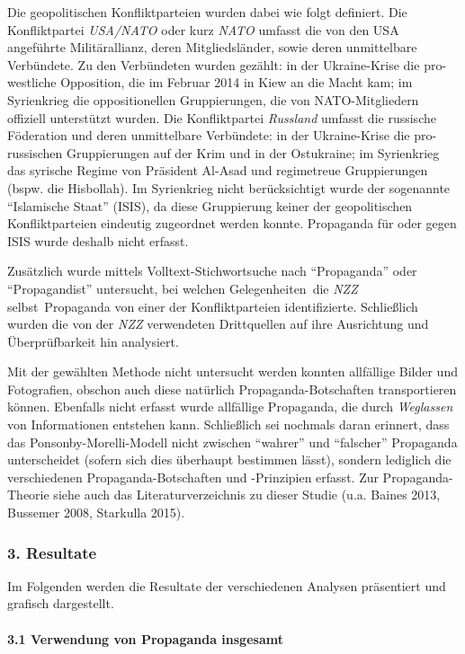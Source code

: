 Die geopolitischen Konflikt­parteien wurden dabei wie folgt definiert.
Die Konfliktpartei \emph{USA/NATO} oder kurz \emph{NATO} umfasst die von
den USA angeführte Militärallianz, deren Mitgliedsländer, sowie deren
unmittelbare Verbündete. Zu den Verbündeten wurden gezählt: in der
Ukraine-Krise die pro-westliche Opposition, die im Februar 2014 in Kiew
an die Macht kam; im Syrienkrieg die oppositionellen Gruppierungen, die
von NATO-Mitgliedern offiziell unterstützt wurden. Die Konfliktpartei
\emph{Russland} umfasst die russische Föderation und deren unmittelbare
Verbündete: in der Ukraine-Krise die pro-russischen Gruppierungen auf
der Krim und in der Ostukraine; im Syrienkrieg das syrische Regime von
Präsident Al-Asad und regimetreue Gruppierungen (bspw. die Hisbollah).
Im Syrienkrieg nicht berücksichtigt wurde der sogenannte ``Islamische
Staat'' (ISIS), da diese Gruppierung keiner der geopolitischen
Konfliktparteien eindeutig zugeordnet werden konnte. Propaganda für oder
gegen ISIS wurde deshalb nicht erfasst.

Zusätzlich wurde mittels Volltext-Stichwortsuche nach ``Propaganda''
oder ``Propagandist'' untersucht, bei welchen Gelegenheiten~die
\emph{NZZ} selbst~Propaganda von einer der Konflikt­parteien
identifizierte. Schließlich wurden die von der \emph{NZZ} verwendeten
Drittquellen auf ihre Ausrichtung und Überprüfbarkeit hin analysiert.

Mit der gewählten Methode nicht untersucht werden konnten allfällige
Bilder und Fotografien, obschon auch diese natürlich
Propaganda-Botschaften transportieren können. Ebenfalls nicht erfasst
wurde allfällige Propaganda, die durch \emph{Weglassen} von
Informationen entstehen kann. Schließlich sei nochmals daran erinnert,
dass das Ponsonby-Morelli-Modell nicht zwischen ``wahrer'' und
``falscher'' Propaganda unterscheidet (sofern sich dies überhaupt
bestimmen lässt), sondern lediglich die verschiedenen
Propaganda-Botschaften und -Prinzipien erfasst. Zur Propaganda-Theorie
siehe auch das Literaturverzeichnis zu dieser Studie (u.a. Baines 2013,
Bussemer 2008, Starkulla 2015).

\hypertarget{3-resultate}{%
\subsubsection{3. Resultate}\label{3-resultate}}

Im Folgenden werden die Resultate der verschiedenen Analysen präsentiert
und grafisch dargestellt.

\hypertarget{31-verwendung-von-propaganda-insgesamt}{%
\paragraph{3.1 Verwendung von Propaganda
insgesamt}\label{31-verwendung-von-propaganda-insgesamt}}


